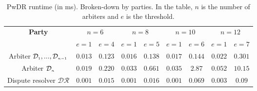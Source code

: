 

 \begin{table*}[!htbp]

\caption{ \small PwDR runtime (in ms). Broken-down by parties. In the table, $n$ is the number of arbiters and $e$ is the threshold.} \label{table::PwDR-runtime} 
\begin{center}

\begin{tabular}{|c|c|c|c|c|c|c|c|c|} 

   \hline
   

\multirow{2}{*}{\scriptsize \textbf{Party}}& \multicolumn{2}{c|}{\scriptsize $n=6$}& \multicolumn{2}{c|}{\scriptsize $n=8$}&\multicolumn{2}{c|}{\scriptsize $n=10$}&\multicolumn{2}{c|}{\scriptsize $n=12$}\\
 \cline{2-9} 
&\scriptsize$e=1$&\scriptsize$e=4$&\scriptsize$e=1$ &\scriptsize$e=5$&\scriptsize$e=1$&\scriptsize$e=6$&\scriptsize$e=1$&\scriptsize$e=7$\\

\hline

   \scriptsize   {Arbiter $\mathcal{D}_{\scriptscriptstyle 1},..., \mathcal{D}_{\scriptscriptstyle n-1}$ }&\cellcolor{gray!20}\scriptsize$0.013$&\cellcolor{gray!20}\scriptsize$0.123$& \cellcolor{gray!20}\scriptsize$0.016$& \cellcolor{gray!20}\scriptsize$ 0.138$&\cellcolor{gray!20}\scriptsize$0.017$&\cellcolor{gray!20}\scriptsize$0.144$&\cellcolor{gray!20}\scriptsize$0.022$&\cellcolor{gray!20}\scriptsize$0.301$\\
         
            \cline{1-5} 


   \scriptsize   {Arbiter $\mathcal{D}_{\scriptscriptstyle n}$ }&\cellcolor{gray!20}\scriptsize$0.019$&\cellcolor{gray!20}\scriptsize$0.220$&\cellcolor{gray!20} \cellcolor{gray!20}\scriptsize$0.033$& \cellcolor{gray!20}\scriptsize$0.661$&\cellcolor{gray!20}\scriptsize$0.035$&\cellcolor{gray!20}\scriptsize$2.87$&\cellcolor{gray!20}\scriptsize$0.052$&\cellcolor{gray!20}\scriptsize$10.15$\\      
           
            \cline{1-5} 

 \scriptsize Dispute resolver $\mathcal{DR}$&\cellcolor{gray!20}\scriptsize$0.001$&\cellcolor{gray!20}\scriptsize$0.015$& \cellcolor{gray!20}\scriptsize $0.001$& \cellcolor{gray!20}\scriptsize$0.016$&\cellcolor{gray!20}\scriptsize$0.001$&\cellcolor{gray!20}\scriptsize$0.069$&\cellcolor{gray!20}\scriptsize$0.003$&\cellcolor{gray!20}\scriptsize$0.09$\\
 
 \hline
 
\end{tabular}  %
\end{center}

\end{table*}




